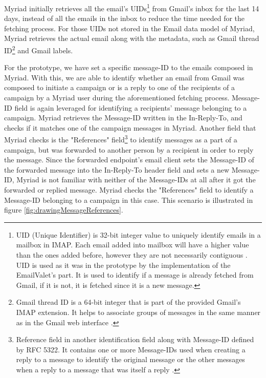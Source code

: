 Myriad initially retrieves all the email's \ac{UID}s\footnote{UID (Unique Identifier) is 32-bit integer value to uniquely identify emails in a mailbox in \ac{IMAP}. Each email added into mailbox will have a higher value than the ones added before, however they are not necessarily contiguous \citep{rfc3501}. \ac{UID} is used as it was in the prototype by the implementation of the EmailValet's part. It is used to identify if a message is already fetched from Gmail, if it is not, it is fetched since it is a new message.} from Gmail's inbox for the last 14 days, instead of all the emails in the inbox to reduce the time needed for the fetching process. For those \ac{UID}s not stored in the Email data model of Myriad, Myriad retrieves the actual email along with the metadata, such as Gmail thread ID\footnote{Gmail thread ID is a 64-bit integer that is part of the provided Gmail's IMAP extension. It helps to associate groups of messages in the same manner as in the Gmail web interface \citep{GoogleInc.2013a}.} and Gmail labels.
\vspace{1cm}

For the prototype, we have set a specific message-ID to the emails composed in Myriad. With this, we are able to identify whether an email from Gmail was composed to initiate a campaign or is a reply to one of the recipients of a campaign by a Myriad user during the aforementioned fetching process. Message-ID field is again leveraged for identifying a recipients' message belonging to a campaign. Myriad retrieves the Message-ID written in the In-Reply-To, and checks if it matches one of the campaign messages in Myriad. Another field that Myriad checks is the "References" field\footnote{Reference field in another identification field along with Message-ID defined by RFC 5322. It contains one or more Message-IDs used when creating a reply to a message to identify the original message or the other messages when a reply to a message that was itself a reply \citep{rfc5322}.} to identify messages as a part of a campaign, but was forwarded to another person by a recipient in order to reply the message. Since the forwarded endpoint's email client sets the Message-ID of the forwarded message into the In-Reply-To header field and sets a new Message-ID, Myriad is not familiar with neither of the Message-IDs at all after it got the forwarded or replied message. Myriad checks the "References" field to identify a Message-ID belonging to a campaign in this case. This scenario is illustrated in figure \ref{fig:drawingMessageReferences}.

